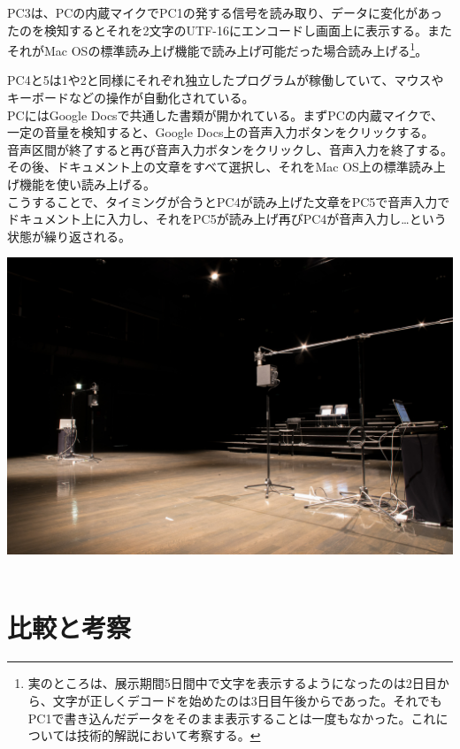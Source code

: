 PC3は、PCの内蔵マイクでPC1の発する信号を読み取り、データに変化があったのを検知するとそれを2文字のUTF-16にエンコードし画面上に表示する。またそれがMac
OSの標準読み上げ機能で読み上げ可能だった場合読み上げる\footnote{実のところは、展示期間5日間中で文字を表示するようになったのは2日目から、文字が正しくデコードを始めたのは3日目午後からであった。それでもPC1で書き込んだデータをそのまま表示することは一度もなかった。これについては技術的解説において考察する。}。

PC4と5は1や2と同様にそれぞれ独立したプログラムが稼働していて、マウスやキーボードなどの操作が自動化されている。\\
PCにはGoogle
Docsで共通した書類が開かれている。まずPCの内蔵マイクで、一定の音量を検知すると、Google
Docs上の音声入力ボタンをクリックする。\\
音声区間が終了すると再び音声入力ボタンをクリックし、音声入力を終了する。その後、ドキュメント上の文章をすべて選択し、それをMac
OS上の標準読み上げ機能を使い読み上げる。\\
こうすることで、タイミングが合うとPC4が読み上げた文章をPC5で音声入力でドキュメント上に入力し、それをPC5が読み上げ再びPC4が音声入力し\ldots{}という状態が繰り返される。

\includegraphics[width=1.00000\textwidth]{img/postpast1.jpg}~

\section{比較と考察}\label{ux6bd4ux8f03ux3068ux8003ux5bdf}

